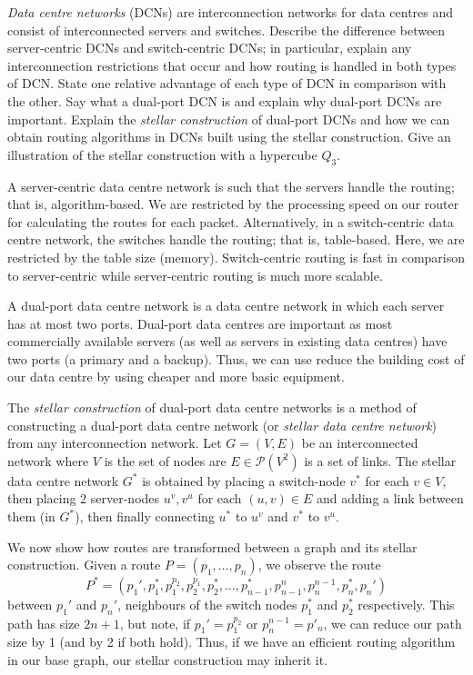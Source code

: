 \question \emph{Data centre networks} (DCNs) are interconnection networks for data centres and consist of interconnected servers and switches. Describe the difference between server-centric DCNs and switch-centric DCNs; in particular, explain any interconnection restrictions that occur and how routing is handled in both types of DCN. State one relative advantage of each type of DCN in comparison with the other. Say what a dual-port DCN is and explain why dual-port DCNs are important. Explain the \emph{stellar construction} of dual-port DCNs and how we can obtain routing algorithms in DCNs built using the stellar construction. Give an illustration of the stellar construction with a hypercube $Q_3$.
\begin{solution}
  A server-centric data centre network is such that the servers handle the routing; that is, algorithm-based. We are restricted by the processing speed on our router for calculating the routes for each packet. Alternatively, in a switch-centric data centre network, the switches handle the routing; that is, table-based. Here, we are restricted by the table size (memory). Switch-centric routing is fast in comparison to server-centric while server-centric routing is much more scalable.

  A dual-port data centre network is a data centre network in which each server has at most two ports. Dual-port data centres are important as most commercially available servers (as well as servers in existing data centres) have two ports (a primary and a backup). Thus, we can use reduce the building cost of our data centre by using cheaper and more basic equipment. 

  The \emph{stellar construction} of dual-port data centre networks is a method of constructing a dual-port data centre network (or \emph{stellar data centre network}) from any interconnection network. Let $G = (V, E)$ be an interconnected network where $V$ is the set of nodes are $E \in \mathcal P(V^2)$ is a set of links. The stellar data centre network $G^*$ is obtained by placing a switch-node $v^*$ for each $v \in V$, then placing 2 server-nodes $u^v, v^u$ for each $(u, v) \in E$ and adding a link between them (in $G^*$), then finally connecting $u^*$ to $u^v$ and $v^*$ to $v^u$.

  We now show how routes are transformed between a graph and its stellar construction. Given a route $P = (p_1, \ldots, p_n)$, we observe the route
  \[
    P^* = (p_1', p_1^*, p_1^{p_2}, p_2^{p_1}, p_2^*, \ldots, p_{n-1}^*, p_{n-1}^n, p_n^{n-1}, p_n^*, p_n')
  \]
  between $p_1'$ and $p_n'$, neighbours of the switch nodes $p_1^*$ and $p_2^*$ respectively. This path has size $2n+1$, but note, if $p_1' = p_1^{p_2}$ or $p_n^{n-1} = p'_n$, we can reduce our path size by 1 (and by 2 if both hold). Thus, if we have an efficient routing algorithm in our base graph, our stellar construction may inherit it.


\end{solution}
